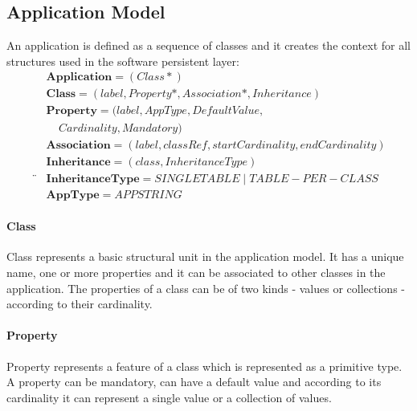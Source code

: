 \documentclass[runningheads]{comsis}
\begin{document}


\subsection{Application Model}
An application is defined as a sequence of classes and it creates the context for all structures used in the software persistent layer:
\begin{align}
& \mathbf{Application} = (Class*) \\
& 	\mathbf{Class} = (label, Property*, Association*, Inheritance) \\
& \mathbf{Property} = (label, AppType, DefaultValue, \nonumber \\ & \;\;\;\;  Cardinality, Mandatory) \\
&	\mathbf{Association} = (label, classRef, startCardinality, endCardinality)  \\
& \mathbf{Inheritance} = (class, InheritanceType) \\¨
& \mathbf{InheritanceType} = SINGLETABLE \; | \; TABLE-PER-CLASS \\
& \mathbf{AppType} = APPSTRING
\end{align}

\paragraph{Class} Class represents a basic structural unit in the application model. It has a unique name, one or more properties and it can be associated to other classes in the application. The properties of a class can be of two kinds - values or collections - according to their cardinality.
	 
\paragraph{Property} Property represents a feature of a class which is represented as a primitive type. A property can be mandatory, can have a default value and according to its cardinality it can represent a single value or a collection of values. 
\end{document}
